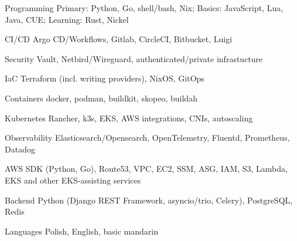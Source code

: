 

\begin{cvskills}

  \cvskill
  {Programming} %
  {Primary: Python, Go, shell/bash, Nix; Basics: JavaScript, Lua, Java, CUE; Learning: Rust, Nickel} %

  \cvskill
  {CI/CD} %
  {Argo CD/Workflows, Gitlab, CircleCI, Bitbucket, Luigi} %

  \cvskill
  {Security} %
  {Vault, Netbird/Wireguard, authenticated/private infrastucture} %

  \cvskill
  {IaC} %
  {Terraform (incl. writing providers), NixOS, GitOps} %

  \cvskill
  {Containers} %
  {docker, podman, buildkit, skopeo, buildah} %

  \cvskill
  {Kubernetes} %
  {Rancher, k3s, EKS, AWS integrations, CNIs, autoscaling} %

  \cvskill
  {Observability} %
  {Elasticsearch/Opensearch, OpenTelemetry, Fluentd, Prometheus, Datadog} %

  \cvskill
  {AWS} %
  {SDK (Python, Go), Route53, VPC, EC2, SSM, ASG, IAM, S3, Lambda, EKS  and other EKS-assisting services} %

  \cvskill
  {Backend} %
  {Python (Django REST Framework, asyncio/trio, Celery), PostgreSQL, Redis} %

  \cvskill
  {Languages} %
  {Polish, English, basic mandarin} %

\end{cvskills}
